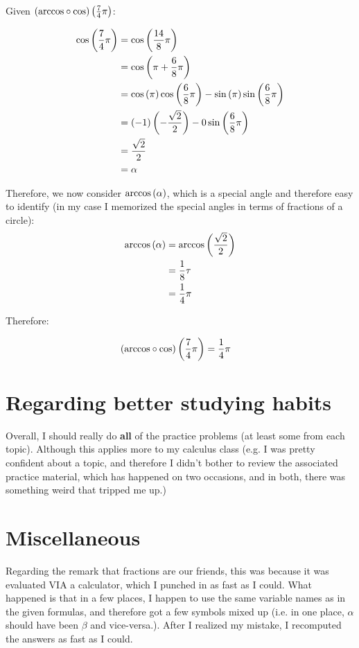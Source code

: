Given $\left({\arccos} \circ {\cos} \right)\left( {\frac{7}{4}\pi} \right)$:

\begin{equation}
\begin{split}
    \cos \left( {\frac{7}{4}\pi} \right) &= \cos \left( {\frac{14}{8}\pi} \right) \\
        &= \cos \left( {\pi + \frac{6}{8}\pi} \right) \\
        &= \cos \left( {\pi} \right)\cos \left( {\frac{6}{8}\pi} \right) - \sin \left( {\pi} \right)\sin \left( {\frac{6}{8}\pi} \right) \\
        &= (-1)\left(-\frac{\sqrt{2}}{2} \right) - 0\sin \left( {\frac{6}{8}\pi} \right) \\
        &= \frac{\sqrt{2}}{2} \\
        &= \alpha
\end{split}
\end{equation}

Therefore, we now consider $\arccos \left( {\alpha} \right)$, which is a special angle and therefore easy to identify (in my case I memorized the special angles in terms of fractions of a circle):
\begin{equation}
\begin{split}
    \arccos \left( {\alpha} \right) &= \arccos \left( {\frac{\sqrt{2}}{2}} \right) \\
        &= \frac{1}{8}\tau \\
        &= \frac{1}{4}\pi
\end{split}
\end{equation}

Therefore:

\begin{equation}
\begin{split}
    \left({\arccos} \circ {\cos} \right)\left( {\frac{7}{4}\pi} \right) &= \frac{1}{4}\pi
\end{split}
\end{equation}

\section*{Regarding better studying habits}

Overall, I should really do \textbf{all} of the practice problems (at least some from each topic). Although this applies more to my calculus class (e.g. I was pretty confident about a topic, and therefore I didn't bother to review the associated practice material, which has happened on two occasions, and in both, there was something weird that tripped me up.)


\section*{Miscellaneous}

Regarding the remark that fractions are our friends, this was because it was evaluated VIA a calculator, which I punched in as fast as I could. What happened is that in a few places, I happen to use the same variable names as in the given formulas, and therefore got a few symbols mixed up (i.e. in one place, $\alpha$ should have been $\beta$ and vice-versa.). After I realized my mistake, I recomputed the answers as fast as I could. 



